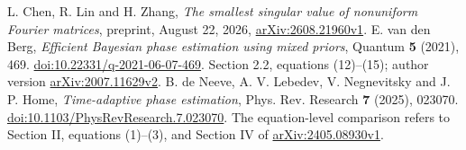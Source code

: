 \documentclass[11pt]{amsart}
\theoremstyle{definition}\newtheorem{definition}[theorem]{Definition}
\theoremstyle{remark}\newtheorem{remark}[theorem]{Remark}
\begin{document}
{L. Chen, R. Lin and H. Zhang,
\emph{The smallest singular value of nonuniform Fourier matrices},
preprint, August 22, 2026,
\href{https://arxiv.org/abs/2608.21960v1}{arXiv:2608.21960v1}.
E. van den Berg, \emph{Efficient Bayesian phase estimation using mixed
priors}, Quantum \textbf{5} (2021), 469.
\href{https://doi.org/10.22331/q-2021-06-07-469}{doi:10.22331/q-2021-06-07-469}.
Section 2.2, equations (12)--(15); author version
\href{https://arxiv.org/abs/2007.11629v2}{arXiv:2007.11629v2}.
B. de Neeve, A. V. Lebedev, V. Negnevitsky and J. P. Home,
\emph{Time-adaptive phase estimation}, Phys. Rev. Research
\textbf{7} (2025), 023070.
\href{https://doi.org/10.1103/PhysRevResearch.7.023070}{doi:10.1103/PhysRevResearch.7.023070}.
The equation-level comparison refers to Section II, equations (1)--(3),
and Section IV of \href{https://arxiv.org/html/2405.08930v1}{arXiv:2405.08930v1}.

\VnineEndBibliography}
\end{document}
